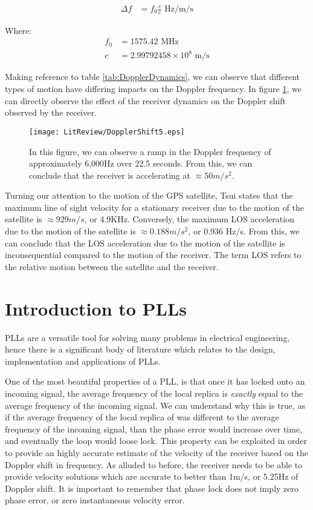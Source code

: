 \begin{align}
\Delta f &= f_0\frac{v}{c} \text{ Hz/m/s}
\label{eq:DopplerShift}
\end{align}

Where: 
\begin{align*}
f_0 &= 1575.42 \text{ MHz}\\   
c &= 2.99792458 \times 10^8 \text{ m/s}
\end{align*}


Making reference to table \ref{tab:DopplerDynamics}, we can observe that different types of motion have differing impacts on the Doppler frequency. In figure \ref{fig:DopplerShift}, we can directly observe the effect of the receiver dynamics on the Doppler shift observed by the receiver.

\begin{figure}[!htb] 
    \centering
    \texttt{[image: LitReview/DopplerShift5.eps]} 
    \caption{In this figure, we can observe a ramp in the Doppler frequency of approximately 6,000Hz over 22.5 seconds. From this, we can conclude that the receiver is accelerating at $\approx50 m/s^2$.}
    \label{fig:DopplerShift}
\end{figure}



Turning our attention to the motion of the GPS satellite, Tsui states that the maximum line of sight velocity for a stationary receiver due to the motion of the satellite is $\approx 929 m/s$, or 4.9KHz. Conversely, the maximum \ac{LOS} acceleration due to the motion of the satellite is $\approx 0.188m/s^2$, or 0.936 Hz/s\cite{Tsui}. From this, we can conclude that the \ac{LOS} acceleration due to the motion of the satellite is inconsequential compared to the motion of the receiver. The term \ac{LOS} refers to the relative motion between the satellite and the receiver. 



\section{Introduction to PLLs}
PLLs are a versatile tool for solving many problems in electrical engineering, hence there is a significant body of literature which relates to the design, implementation and applications of PLLs. 

One of the most beautiful properties of a PLL, is that once it has locked onto an incoming signal, the average frequency of the local replica is \emph{exactly} equal to the average frequency of the incoming signal. We can understand why this is true, as if the average frequency of the local replica of was different to the average frequency of the incoming signal, than the phase error would increase over time, and eventually the loop would loose lock. This property can be exploited in order to provide an highly accurate estimate of the velocity of the receiver based on the Doppler shift in frequency. As alluded to before, the receiver needs to be able to provide velocity solutions which are accurate to better than 1m/s, or 5.25Hz of Doppler shift. It is important to remember that phase lock does not imply zero phase error, or zero instantaneous velocity error\cite{Gardner}. 

